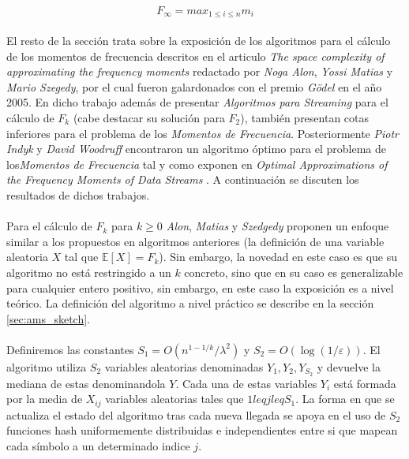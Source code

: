 \documentclass{subfiles}
\begin{document}
      \begin{equation}
      \label{eq:frecuency_moments_max}
        F_\infty = max_{1 \leq i \leq n} m_i
      \end{equation}

      \paragraph{}
      El resto de la sección trata sobre la exposición de los algoritmos para el cálculo de los momentos de frecuencia descritos en el articulo \emph{The space complexity of approximating the frequency moments} \cite{alon1996space} redactado por \emph{Noga Alon}, \emph{Yossi Matias} y \emph{Mario Szegedy}, por el cual fueron galardonados con el premio \emph{Gödel} en el año 2005. En dicho trabajo además de presentar \emph{Algoritmos para Streaming} para el cálculo de $F_k$ (cabe destacar su solución para $F_2$), también presentan cotas inferiores para el problema de los \emph{Momentos de Frecuencia}. Posteriormente \emph{Piotr Indyk} y \emph{David Woodruff} encontraron un algoritmo óptimo para el problema de los\emph{Momentos de Frecuencia} tal y como exponen en \emph{Optimal Approximations of the Frequency Moments of Data Streams} \cite{indyk2005optimal}. A continuación se discuten los resultados de dichos trabajos.

      \paragraph{}
      Para el cálculo de $F_k$ para $k \geq 0$ \emph{Alon}, \emph{Matias} y \emph{Szedgedy} proponen un enfoque similar a los propuestos en algoritmos anteriores (la definición de una variable aleatoria $X$ tal que $\mathbb{E}[X] = F_k$). Sin embargo, la novedad en este caso es que su algoritmo no está restringido a un $k$ concreto, sino que en su caso es generalizable para cualquier entero positivo, sin embargo, en este caso la exposición es a nivel teórico. La definición del algoritmo a nivel práctico se describe en la sección \ref{sec:ams_sketch}.

      \paragraph{}
      Definiremos las constantes $S_1 =O(n^{1-1/k}/\lambda ^{2})$ y $S_2 = O(\log(1/\varepsilon ))$. El algoritmo utiliza $S_2$ variables aleatorias denominadas $Y_1, Y_2, Y_{S_2}$ y devuelve la mediana de estas denominandola $Y$. Cada una de estas variables $Y_i$ está formada por la media de $X_{ij}$ variables aleatorias tales que $1 leq j leq S_1$. La forma en que se actualiza el estado del algoritmo tras cada nueva llegada se apoya en el uso de $S_2$ funciones hash uniformemente distribuidas e independientes entre si que mapean cada símbolo a un determinado indice $j$.
\end{document}
